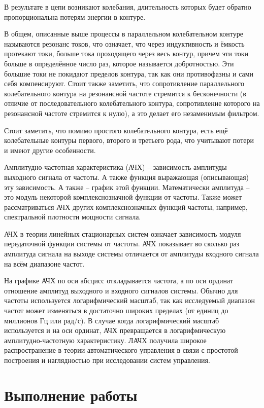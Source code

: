 \documentclass[a4paper,14pt]{article}
\begin{document}
В результате в цепи возникают колебания, длительность которых будет обратно пропорциональна потерям энергии в контуре.

В общем, описанные выше процессы в параллельном колебательном контуре называются резонанс токов, что означает, что через индуктивность и ёмкость протекают токи, больше тока проходящего через весь контур, причем эти токи больше в определённое число раз, которое называется добротностью. 
Эти большие токи не покидают пределов контура, так как они противофазны и сами себя компенсируют. 
Стоит также заметить, что сопротивление параллельного колебательного контура на резонансной частоте стремится к бесконечности (в отличие от последовательного колебательного контура, сопротивление которого на резонансной частоте стремится к нулю), а это делает его незаменимым фильтром.

Стоит заметить, что помимо простого колебательного контура, есть ещё колебательные контуры первого, второго и третьего рода, что учитывают потери и имеют другие особенности.

Амплитудно-частотная характеристика (АЧХ) -- зависимость амплитуды выходного сигнала от частоты.
А также функция выражающая (описывающая) эту зависимость. 
А также -- график этой функции. 
Математически амплитуда -- это модуль некоторой комплекснозначной функции от частоты.
Также может рассматриваться АЧХ других комплекснозначных функций частоты, например, спектральной плотности мощности сигнала.

АЧХ в теории линейных стационарных систем означает зависимость модуля передаточной функции системы от частоты.
АЧХ показывает во сколько раз амплитуда сигнала на выходе системы отличается от амплитуды входного сигнала на всём диапазоне частот.

На графике АЧХ по оси абсцисс откладывается частота, а по оси ординат отношение амплитуд выходного и входного сигналов системы. 
Обычно для частоты используется логарифмический масштаб, так как исследуемый диапазон частот может изменяться в достаточно широких пределах (от единиц до миллионов Гц или рад/с). 
В случае когда логарифмический масштаб используется и на оси ординат, АЧХ превращается в логарифмическую амплитудно-частотную характеристику. 
ЛАЧХ получила широкое распространение в теории автоматического управления в связи с простотой построения и наглядностью при исследовании систем управления.

\section{Выполнение работы}
\end{document}
